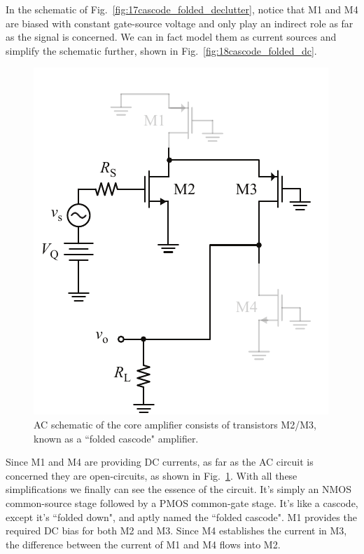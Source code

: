 In the schematic of Fig.~\ref{fig:17cascode_folded_declutter}, notice that M1 and M4 are biased with constant gate-source voltage and only play an indirect role as far as the signal is concerned.  We can in fact model them as current sources and simplify the schematic further, shown in Fig.~\ref{fig:18cascode_folded_dc}.
\begin{figure}[tb]
\begin{center}
\includegraphics[scale=1]{19cascode_folded_ac}
\end{center}
\caption{AC schematic of the core amplifier consists of transistors M2/M3, known as a ``folded cascode" amplifier.}
\label{fig:19cascode_folded_ac}
\end{figure}

Since M1 and M4 are providing DC currents, as far as the AC circuit is concerned they are open-circuits, as shown in Fig.~\ref{fig:19cascode_folded_ac}.  With all these simplifications we finally can see the essence of the circuit. It's simply an NMOS common-source stage followed by a PMOS common-gate stage.  It's like a cascode, except it's ``folded down", and aptly named the ``folded cascode".  M1 provides the required DC bias for both M2 and M3.  Since M4 establishes the current in M3, the difference between the current of M1 and M4 flows into M2.

